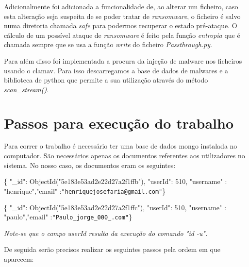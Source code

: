  \par Adicionalmente foi adicionada a funcionalidade de, ao alterar um ficheiro, caso esta alteração seja suspeita de se poder tratar de \textit{ransomware}, o ficheiro é salvo numa diretoria chamada \textit{safe} para podermos recuperar o estado pré-ataque. O cálculo de um possível ataque de \textit{ransomware} é feito pela função \textit{entropia} que é chamada sempre que se usa a função \textit{write} do ficheiro \textit{Passthrough.py}.\newline
 \par Para além disso foi implementada a procura da injeção de malware nos ficheiros usando o clamav. Para isso descarregamos a base de dados de malwares e a biblioteca de python que permite a sua utilização através do método \textit{scan_stream()}.

\section{Passos para execução do trabalho}

 Para correr o trabalho é necessário ter uma base de dados mongo instalada no computador. São necessários apenas os documentos referentes aos utilizadores no sistema. No nosso caso, os documentos eram os seguintes:\newline


 \par \{ "\_id": ObjectId("5e183e53ad2e22d27a2f1ffb"), "userId": 510, "username" : "henrique",\newline "email" :\texttt{"henriquejosefaria@gmail.com"}\} \newline
 \par \{ "\_id": ObjectId("5e183e53ad2e22d27a2f1ffc"), "userId": 510, "username" : "paulo",\newline "email" :\texttt{"Paulo\_jorge\_000\_\@hotmail.com"}\}\newline



\par\textit{ Note-se que o campo userId resulta da execução do comando "id -u".}\newline


\par De seguida serão precisos realizar os seguintes passos pela ordem em que aparecem:\newline



